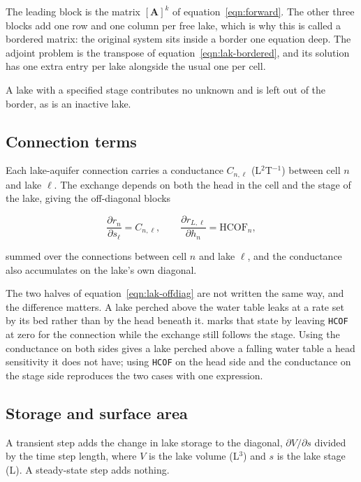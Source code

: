 The leading block is the matrix $\left[ \mathbf{A} \right]^{k}$ of equation~\ref{eqn:forward}. The other three blocks add one row and one column per free lake, which is why this is called a bordered matrix: the original system sits inside a border one equation deep. The adjoint problem is the transpose of equation~\ref{eqn:lak-bordered}, and its solution has one extra entry per lake alongside the usual one per cell.

A lake with a specified stage contributes no unknown and is left out of the border, as is an inactive lake.

\subsection*{Connection terms}

Each lake-aquifer connection carries a conductance $C_{n,\ell}$ (L$^{2}$T$^{-1}$) between cell $n$ and lake $\ell$. The exchange depends on both the head in the cell and the stage of the lake, giving the off-diagonal blocks

\begin{equation}
	\label{eqn:lak-offdiag}
	\frac{\partial r_{n}}{\partial s_{\ell}} = C_{n,\ell}, \qquad
	\frac{\partial r_{L,\ell}}{\partial h_{n}} = \mathrm{HCOF}_{n},
\end{equation}

\noindent summed over the connections between cell $n$ and lake $\ell$, and the conductance also accumulates on the lake's own diagonal.

The two halves of equation~\ref{eqn:lak-offdiag} are not written the same way, and the difference matters. A lake perched above the water table leaks at a rate set by its bed rather than by the head beneath it. \mf{} marks that state by leaving \texttt{HCOF} at zero for the connection while the exchange still follows the stage. Using the conductance on both sides gives a lake perched above a falling water table a head sensitivity it does not have; using \texttt{HCOF} on the head side and the conductance on the stage side reproduces the two cases with one expression.

\subsection*{Storage and surface area}

A transient step adds the change in lake storage to the diagonal, $\partial V / \partial s$ divided by the time step length, where $V$ is the lake volume (L$^{3}$) and $s$ is the lake stage (L). A steady-state step adds nothing.

